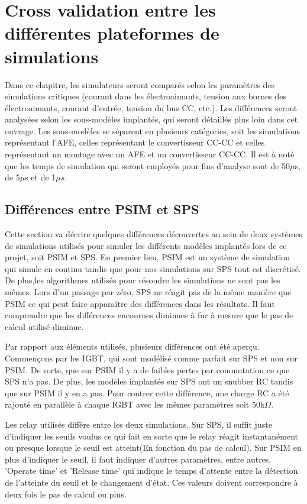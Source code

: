 \documentclass[11pt,letterpaper,final]{report}
\begin{document}
\chapter{Cross validation entre les différentes plateformes de simulations}
Dans ce chapitre, les simulateurs seront comparés selon les paramètres des simulations critiques (courant dans les électroaimants, tension aux bornes des électroaimants, courant d'entrée, tension du bus CC, etc.). Les différences seront analysées selon les sous-modèles implantés, qui seront détaillés plus loin dans cet ouvrage. Les sous-modèles se séparent en plusieurs catégories, soit les simulations représentant l'AFE, celles représentant le convertisseur CC-CC et celles représentant un montage avec un AFE et un convertisseur CC-CC. Il est à noté que les temps de simulation qui seront employés pour fins d'analyse sont de 50$\mu$s, de 5$\mu$s et de 1$\mu s$. 

\section{Différences entre PSIM et SPS}
Cette section va décrire quelques différences découvertes au sein de deux systèmes de simulations utilisés pour simuler les différents modèles implantés lors de ce projet, soit PSIM et SPS. En premier lieu, PSIM est un système de simulation qui simule en continu tandis que pour nos simulations sur SPS tout est discrétisé. De plus,les algorithmes utilisés pour résoudre les simulations ne sont pas les mêmes. Lors d'un passage par zéro, SPS ne réagit pas de la même manière que PSIM ce qui peut faire apparaître des différences dans les résultats. Il faut comprendre que les différences encourues diminues à fur à mesure que le pas de calcul utilisé diminue.  

Par rapport aux éléments utilisés, plusieurs différences ont été aperçu. Commençons par les IGBT, qui sont modélisé comme parfait sur SPS et non sur PSIM. De sorte, que sur PSIM il y a de faibles pertes par commutation ce que SPS n'a pas. De plus, les modèles implantés sur SPS ont un snubber RC tandis que sur PSIM il y en a pas. Pour contrer cette différence, une charge RC a été rajouté en parallèle à chaque IGBT avec les mêmes paramètres soit 50k$\Omega$.

Les relay utilisés diffère entre les deux simulations. Sur SPS, il suffit juste d'indiquer les seuils voulus ce qui fait en sorte que le relay réagit instantanément ou presque lorsque le seuil est atteint(En fonction du pas de calcul). Sur PSIM en plus d'indiquer le seuil, il faut indiquer d'autres paramètres, entre autres, 'Operate time' et 'Release time' qui indique le temps d'attente entre la détection de l'atteinte du seuil et le changement d'état. Ces valeurs doivent correspondre à deux fois le pas de calcul ou plus.
\end{document}
